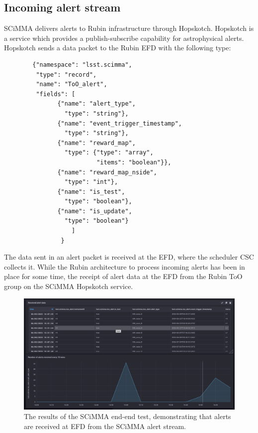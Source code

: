 \subsection{Incoming alert stream}\label{subsec:alertStream verification}

SCiMMA delivers alerts to Rubin infrastructure through Hopskotch. Hopskotch is a service which provides a publish-subscribe capability for astrophysical alerts. Hopskotch sends a data packet to the Rubin EFD with the following type:

\begin{lstlisting}
        {"namespace": "lsst.scimma",
         "type": "record",
         "name": "ToO_alert",
         "fields": [
               {"name": "alert_type",
                 "type": "string"},
               {"name": "event_trigger_timestamp",
                 "type": "string"},
               {"name": "reward_map",
                 "type": {"type": "array",
                          "items": "boolean"}},
               {"name": "reward_map_nside",
                 "type": "int"},
               {"name": "is_test",
                 "type": "boolean"},
               {"name": "is_update",
                 "type": "boolean"}
                   ]
                }
\end{lstlisting}

The data sent in an alert packet is received at the EFD, where the scheduler CSC collects it. While the Rubin architecture to process incoming alerts has been in place for some time, the receipt of alert data at the EFD from the Rubin ToO group on the SCiMMA Hopskotch service.

\begin{figure}
    \centering
    \includegraphics[width=\linewidth]{figures/image.png}
    \caption{The results of the SCiMMA end-end test, demonstrating that alerts are received at EFD from the SCiMMA alert stream.}
    \label{fig:SCiMMA-test result}
\end{figure}

